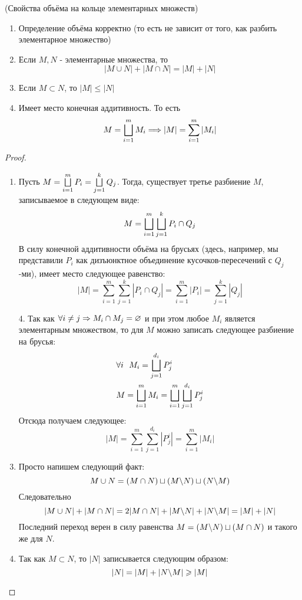 \begin{theorem} (Свойства объёма на кольце элементарных множеств)
	\begin{enumerate}
		\item Определение объёма корректно (то есть не зависит от того, как разбить элементарное множество)
		
		\item Если $M, N$ - элементарные множества, то
		\[
			|M \cup N| + |M \cap N| = |M| + |N|
		\]
		
		\item Если $M \subset N$, то $|M| \le |N|$
		
		\item Имеет место конечная аддитивность. То есть
		\[
			M = \bigsqcup\limits_{i = 1}^m M_i \Longrightarrow |M| = \sum\limits_{i = 1}^m |M_i|
		\]
	\end{enumerate}
\end{theorem}

\begin{proof}~
	\begin{enumerate}
		\item Пусть \(M = \bigsqcup\limits_{i = 1}^m P_i = \bigsqcup\limits_{j = 1}^k Q_j\). Тогда, существует третье разбиение $M$, записываемое в следующем виде:
		\[
			M = \bigsqcup\limits_{i = 1}^m \bigsqcup\limits_{j = 1}^k P_i \cap Q_j
		\]
		В силу конечной аддитивности объёма на брусьях (здесь, например, мы представили $P_i$ как дизъюнктное объединение кусочков-пересечений с $Q_j$-ми), имеет место следующее равенство:
		\[
			|M| = \sum_{i = 1}^m \sum_{j = 1}^k |P_i \cap Q_j| = \sum_{i = 1}^m |P_i| = \sum_{j = 1}^k |Q_j|
		\]
		
		\item[4.] Так как $\forall i \neq j \Rightarrow M_i \cap M_j = \varnothing$ и при этом любое $M_i$ является элементарным множеством, то для $M$ можно записать следующее разбиение на брусья:
		\begin{align*}
			&{\forall i\ \ M_i = \bigsqcup\limits_{j = 1}^{d_i} P_j^i}
			\\
			&{M = \bigsqcup\limits_{i = 1}^m M_i = \bigsqcup\limits_{i = 1}^m \bigsqcup\limits_{j = 1}^{d_i} P_j^i}
		\end{align*}
		Отсюда получаем следующее:
		\[
			|M| = \sum_{i = 1}^m \sum_{j = 1}^{d_i} |P_j^i| = \sum_{i = 1}^m |M_i|
		\]
		
		\item Просто напишем следующий факт:
		\[
			M \cup N = (M \cap N) \sqcup (M \backslash N) \sqcup (N \backslash M)
		\]
		Следовательно
		\[
			|M \cup N| + |M \cap N| = 2|M \cap N| + |M \backslash N| + |N \backslash M| = |M| + |N|
		\]
		Последний переход верен в силу равенства $M = (M \backslash N) \sqcup (M \cap N)$ и такого же для $N$.
		
		\item Так как $M \subset N$, то $|N|$ записывается следующим образом:
		\[
			|N| = |M| + |N \backslash M| \geqslant |M|
		\]
	\end{enumerate}
\end{proof}

